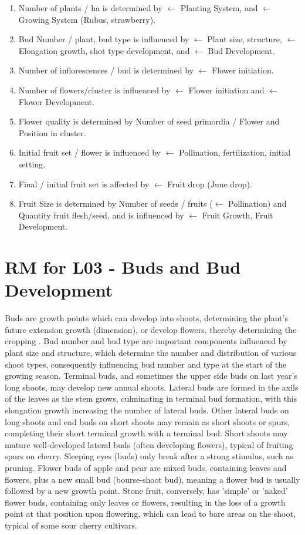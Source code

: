 \begin{enumerate} 
    \item Number of plants / ha is determined by $\leftarrow$ Planting System, and $\leftarrow$ Growing System (Rubus, strawberry). 
    \item Bud Number / plant, bud type is influenced by $\leftarrow$ Plant size, structure, $\leftarrow$ Elongation growth, shot type development, and $\leftarrow$ Bud Development. 
    \item Number of inflorescences / bud is determined by $\leftarrow$ Flower initiation. 
    \item Number of flowers/cluster is influenced by $\leftarrow$ Flower initiation and $\leftarrow$ Flower Development. 
    \item Flower quality is determined by Number of seed primordia / Flower and Position in cluster. 
    \item Initial fruit set / flower is influenced by $\leftarrow$ Pollination, fertilization, initial setting. 
    \item Final / initial fruit set is affected by $\leftarrow$ Fruit drop (June drop). 
    \item Fruit Size is determined by Number of seeds / fruits ($\leftarrow$ Pollination) and Quantity fruit flesh/seed, and is influenced by $\leftarrow$ Fruit Growth, Fruit Development. 
\end{enumerate}


\section{RM for L03 - Buds and Bud Development}

Buds are growth points which can develop into shoots, determining the plant's future extension growth (dimension), or develop flowers, thereby determining the cropping \cite*{rm_02_L03_buds_bud_development}. Bud number and bud type are important components influenced by plant size and structure, which determine the number and distribution of various shoot types, consequently influencing bud number and type at the start of the growing season. Terminal buds, and sometimes the upper side buds on last year's long shoots, may develop new annual shoots. Lateral buds are formed in the axils of the leaves as the stem grows, culminating in terminal bud formation, with this elongation growth increasing the number of lateral buds. Other lateral buds on long shoots and end buds on short shoots may remain as short shoots or spurs, completing their short terminal growth with a terminal bud. Short shoots may mature well-developed lateral buds (often developing flowers), typical of fruiting spurs on cherry. Sleeping eyes (buds) only break after a strong stimulus, such as pruning. Flower buds of apple and pear are mixed buds, containing leaves and flowers, plus a new small bud (bourse-shoot bud), meaning a flower bud is usually followed by a new growth point. Stone fruit, conversely, has 'simple' or 'naked' flower buds, containing only leaves or flowers, resulting in the loss of a growth point at that position upon flowering, which can lead to bare areas on the shoot, typical of some sour cherry cultivars.

